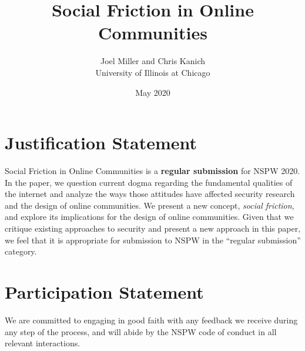 \documentclass{article}
\title{Social Friction in Online Communities}
\author{Joel Miller and Chris Kanich\\University of Illinois at Chicago}
\date{May 2020}
\begin{document}
\maketitle

\section{Justification Statement}


Social Friction in Online Communities is a \textbf{regular submission} for NSPW 2020. In the paper, we question current dogma regarding the fundamental qualities of the internet and analyze the ways those attitudes have affected security research and the design of online communities. We present a new concept, \textit{social friction}, and explore its implications for the design of online communities. Given that we critique existing approaches to security and present a new approach in this paper, we feel that it is  appropriate for submission to NSPW in the ``regular submission'' category.

\section{Participation Statement}


We are committed to engaging in good faith with any feedback we receive during any step of the process, and will abide by the NSPW code of conduct in all relevant interactions. 
\end{document}

